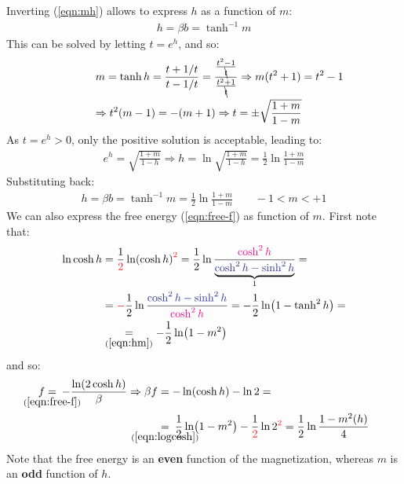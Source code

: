 \documentclass[../template.tex]{subfiles}
\begin{document}
\begin{example}
    Inverting (\ref{eqn:mh}) allows to express $h$ as a function of $m$:
    \begin{align*}
        h = \beta b = \tanh^{-1} m
    \end{align*}
    This can be solved by letting $t = e^h$, and so:
    \begin{align*}
        m = \tanh h = \frac{t + 1/t}{t-1/t} = \dfrac{\frac{t^2-1}{\bcancel{t}}}{\frac{t^2+1}{\bcancel{t}}} \Rightarrow m(t^2 +1) = t^2 - 1 \\ \Rightarrow t^2 (m-1) = -(m+1) \Rightarrow t= \pm \sqrt{\frac{1+m}{1-m} } \span
    \end{align*}
    As $t = e^h > 0$, only the positive solution is acceptable, leading to:
    \begin{align*}
        e^h = \sqrt{\frac{1+m}{1-h}} \Rightarrow h = \ln \sqrt{\frac{1+m}{1-h} } = \frac{1}{2} \ln \frac{1+m}{1-m}  
    \end{align*}
    Substituting back:
    \begin{align}\label{eqn:hm}
        h = \beta b = \tanh^{-1} m = \frac{1}{2} \ln \frac{1+m}{1-m} \qquad -1 < m < +1 
    \end{align}
    We can also express the free energy (\ref{eqn:free-f}) as function of $m$. First note that:
    \begin{align}\nonumber
        \ln \cosh h &= \frac{1}{\textcolor{Red}{2}} \ln (\cosh h)^{\textcolor{Red}{2}} = \frac{1}{2} \ln \frac{\textcolor{Magenta}{\cosh^2 h}}{\underbrace{\textcolor{Blue}{\cosh^2 h - \sinh^2 h}}_{1}} = \\ \nonumber
        &= \textcolor{Red}{-}\frac{1}{2} \ln \frac{\textcolor{Blue}{\cosh^2 h - \sinh^2 h}}{\textcolor{Magenta}{\cosh^2 h}} =- \frac{1}{2} \ln (1 - \tanh^2 h) =\\ \label{eqn:logcosh}
        &\underset{(\ref{eqn:hm})}{=} - \frac{1}{2} \ln (1 - m^2)  
    \end{align}
    and so:
    \begin{align}\nonumber
        f \underset{\mathclap{(\ref{eqn:free-f})}}{=}\> -\frac{\ln (2 \cosh h)}{\beta} \Rightarrow \beta f &=  -\ln(\cosh h) - \ln 2 = \\
        &\underset{\mathclap{(\ref{eqn:logcosh})}}{=}\> \frac{1}{2} \ln (1-m^2) - \frac{1}{\textcolor{Red}{2}} \ln 2^{\textcolor{Red}{2}} = \frac{1}{2} \ln \frac{1-m^2(h)}{4}  \label{eqn:f-h}
    \end{align}
    Note that the free energy is an \textbf{even} function of the magnetization, whereas $m$ is an \textbf{odd} function of $h$. 


\end{example}
\end{document}
